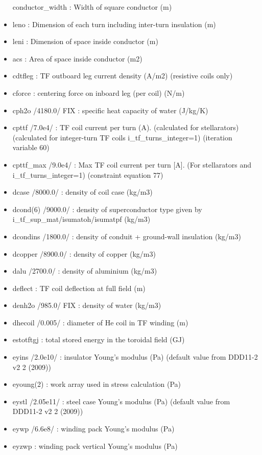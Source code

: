 \documentclass[]{article}
\begin{document}
\begin{itemize}
  conductor\_width : Width of square conductor (m)
\item
  leno : Dimension of each turn including inter-turn insulation (m)
\item
  leni : Dimension of space inside conductor (m)
\item
  acs : Area of space inside conductor (m2)
\item
  cdtfleg : TF outboard leg current density (A/m2) (resistive coils
  only)
\item
  cforce : centering force on inboard leg (per coil) (N/m)
\item
  cph2o /4180.0/ FIX : specific heat capacity of water (J/kg/K)
\item
  cpttf /7.0e4/ : TF coil current per turn (A). (calculated for
  stellarators) (calculated for integer-turn TF coils
  i\_tf\_turns\_integer=1) (iteration variable 60)
\item
  cpttf\_max /9.0e4/ : Max TF coil current per turn {[}A{]}. (For
  stellarators and i\_tf\_turns\_integer=1) (constraint equation 77)
\item
  dcase /8000.0/ : density of coil case (kg/m3)
\item
  dcond(6) /9000.0/ : density of superconductor type given by
  i\_tf\_sup\_mat/isumatoh/isumatpf (kg/m3)
\item
  dcondins /1800.0/ : density of conduit + ground-wall insulation
  (kg/m3)
\item
  dcopper /8900.0/ : density of copper (kg/m3)
\item
  dalu /2700.0/ : density of aluminium (kg/m3)
\item
  deflect : TF coil deflection at full field (m)
\item
  denh2o /985.0/ FIX : density of water (kg/m3)
\item
  dhecoil /0.005/ : diameter of He coil in TF winding (m)
\item
  estotftgj : total stored energy in the toroidal field (GJ)
\item
  eyins /2.0e10/ : insulator Young's modulus (Pa) (default value from
  DDD11-2 v2 2 (2009))
\item
  eyoung(2) : work array used in stress calculation (Pa)
\item
  eystl /2.05e11/ : steel case Young's modulus (Pa) (default value from
  DDD11-2 v2 2 (2009))
\item
  eywp /6.6e8/ : winding pack Young's modulus (Pa)
\item
  eyzwp : winding pack vertical Young's modulus (Pa)

\end{itemize}
\end{document}
